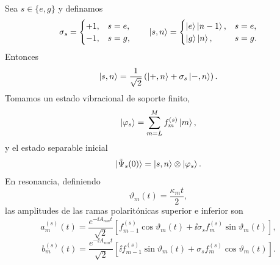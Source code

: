 Sea $s\in\{e,g\}$ y definamos
\begin{equation}
  \sigma_s=
  \begin{cases}
    +1, & s=e,\\
    -1, & s=g,
  \end{cases}
  \qquad
  \ket{s,n}=
  \begin{cases}
    \ket e\ket{n-1}, & s=e,\\
    \ket g\ket n, & s=g.
  \end{cases}
\end{equation}
Entonces
\begin{equation}
  \ket{s,n}
  =
  \frac{1}{\sqrt2}
  \left(
  \ket{+,n}+\sigma_s\ket{-,n}
  \right).
\end{equation}
Tomamos un estado vibracional de soporte finito,
\begin{equation}
  \ket{\varphi_s}
  =
  \sum_{m=L}^{M}f_m^{(s)}\ket m,
\end{equation}
y el estado separable inicial
\begin{equation}
  \ket{\tilde\Psi_s(0)}
  =
  \ket{s,n}\otimes\ket{\varphi_s}.
\end{equation}
En resonancia, definiendo
\begin{equation}
  \vartheta_m(t)=\frac{\kappa_m t}{2},
\end{equation}
las amplitudes de las ramas polarit\'onicas superior e inferior son
\begin{equation}
  a_m^{(s)}(t)
  =
  \frac{e^{-\ii A_{nm}t}}{\sqrt2}
  \left[
  f_{m-1}^{(s)}\cos\vartheta_m(t)
  +\ii\sigma_s f_m^{(s)}\sin\vartheta_m(t)
  \right],
\end{equation}
\begin{equation}
  b_m^{(s)}(t)
  =
  \frac{e^{-\ii A_{nm}t}}{\sqrt2}
  \left[
  \ii f_{m-1}^{(s)}\sin\vartheta_m(t)
  +\sigma_s f_m^{(s)}\cos\vartheta_m(t)
  \right].
\end{equation}

